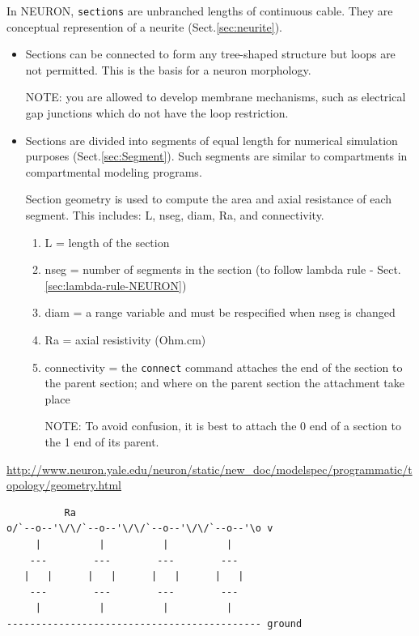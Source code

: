 In NEURON, \verb!sections! are unbranched lengths of continuous cable. They are
conceptual represention of a neurite (Sect.\ref{sec:neurite}).
\begin{itemize}
  \item  Sections can be connected to form any tree-shaped structure but loops
  are not permitted. This is the basis for a neuron morphology.
  
  NOTE: you are allowed to develop membrane mechanisms, such as electrical gap
  junctions which do not have the loop restriction.
  
  
  \item  Sections are divided into segments of equal length for numerical
  simulation purposes (Sect.\ref{sec:Segment}).
  Such segments are similar to compartments in compartmental modeling programs.

  Section geometry is used to compute the area and axial resistance of each
  segment. This includes: L, nseg, diam, Ra, and connectivity.
  \begin{enumerate}
    \item L = length of the section
    \item nseg = number of segments in the section (to follow lambda rule -
    Sect.\ref{sec:lambda-rule-NEURON})
    \item diam = a range variable and must be respecified when nseg is changed
    
    \item Ra = axial resistivity (Ohm.cm)
    
    \item connectivity = the \verb!connect! command attaches the end of the
    section to the parent section; and where on the parent section the
    attachment take place
    
    NOTE: To avoid confusion, it is best to attach the 0 end of a section to the
    1 end of its parent.
  \end{enumerate}
  
\end{itemize}

\url{http://www.neuron.yale.edu/neuron/static/new_doc/modelspec/programmatic/topology/geometry.html}

\begin{verbatim}
          Ra
o/`--o--'\/\/`--o--'\/\/`--o--'\/\/`--o--'\o v
     |          |          |          |
    ---        ---        ---        ---
   |   |      |   |      |   |      |   |
    ---        ---        ---        ---
     |          |          |          |
-------------------------------------------- ground
\end{verbatim}



